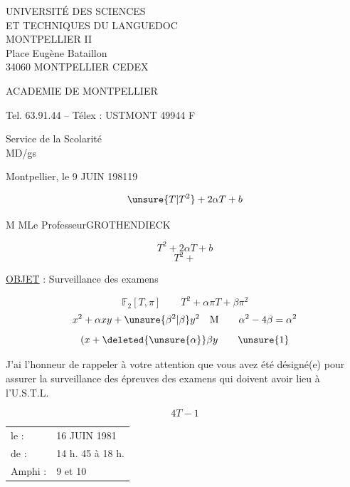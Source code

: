 UNIVERSITÉ DES SCIENCES\\
ET TECHNIQUES DU LANGUEDOC\\
MONTPELLIER II\\
Place Eugène Bataillon\\
34060 MONTPELLIER CEDEX

ACADEMIE DE MONTPELLIER

Tel. 63.91.44 -- Télex : USTMONT 49944 F

Service de la Scolarité\\
MD/gs

Montpellier, le  9 JUIN 1981\hfill 19

\[
\unsure{T|T^2}+2\alpha T+b
\]

M M\quad Le Professeur\quad GROTHENDIECK

\[
T^2+2\alpha T+b
\]
\[
T^2+
\]

\uline{OBJET} : Surveillance des examens

\[
\mathbb F_2[T,\pi]\qquad T^2+\alpha\pi T+\beta\pi^2
\]
\[
x^2+\alpha xy+\unsure{\beta^2|\beta}y^2\quad\text{M}
\qquad
\alpha^2-4\beta=\alpha^2
\]
\[
(x+\deleted{\unsure{\alpha}}\beta y
\qquad\unsure{1}
\]

J'ai l'honneur de rappeler à votre attention que vous
avez été désigné(e) pour assurer la surveillance des épreuves des examens
qui doivent avoir lieu à l'U.S.T.L.

\[
4T-1
\]

\begin{tabular}{ll}
le : & 16 JUIN 1981\\
de : & 14 h. 45 à 18 h.\\
Amphi : & 9 et 10
\end{tabular}

\noindent{}

